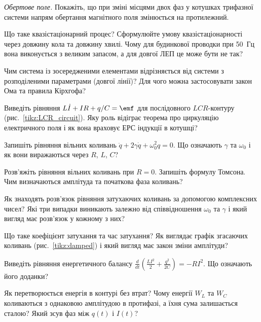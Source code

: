 \begin{problem}\label{prb:RotatingField}
	\emph{Обертове поле.} Покажіть, що при зміні місцями двох фаз у котушках трифазної системи напрям обертання магнітного поля змінюється на протилежний.
\end{problem}


\begin{Questions}
\begin{quizlist}
	\item Що таке квазістаціонарний процес? Сформулюйте умову квазістаціонарності через довжину кола та довжину хвилі. Чому для будинкової проводки при 50~Гц вона виконується з великим запасом, а для довгої ЛЕП це може бути не так?
	\item Чим система із зосередженими елементами відрізняється від системи з розподіленими параметрами (довгої лінії)? Для чого можна застосовувати закон Ома та правила Кірхгофа?
	\item Виведіть рівняння $L\dot I + IR + q/C = \emf$ для послідовного $LCR$-контуру (рис.~\ref{tikz:LCR_circuit}). Яку роль відіграє теорема про циркуляцію електричного поля і як вона враховує ЕРС індукції в котушці?
	\item Запишіть рівняння вільних коливань $\ddot q + 2\gamma\dot q + \omega_0^2 q = 0$. Що означають $\gamma$ та $\omega_0$ і як вони виражаються через $R$, $L$, $C$?
	\item Розв'яжіть рівняння вільних коливань при $R=0$. Запишіть формулу Томсона. Чим визначаються амплітуда та початкова фаза коливань?
	\item Як знаходять розв'язок рівняння затухаючих коливань за допомогою комплексних чисел? Які три випадки виникають залежно від співвідношення $\omega_0$ та $\gamma$ і який вигляд має розв'язок у кожному з них?
	\item Що таке коефіцієнт затухання та час затухання? Як виглядає графік згасаючих коливань (рис.~\ref{tikz:damped}) і який вигляд має закон зміни амплітуди?
	\item Виведіть рівняння енергетичного балансу $\frac{d}{dt}\left(\frac{LI^2}{2}+\frac{q^2}{2C}\right) = -RI^2$. Що означають його доданки?
	\item Як перетворюється енергія в контурі без втрат? Чому енергії $W_L$ та $W_C$ коливаються з однаковою амплітудою в протифазі, а їхня сума залишається сталою? Який зсув фаз між $q(t)$ і $I(t)$?

\end{quizlist}
\end{Questions}
